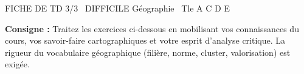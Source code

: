 \documentclass[11pt]{article}
\begin{document}
\begin{tcolorbox}[enhanced,colback=popink,colframe=popink,arc=10pt,boxrule=0pt,left=12pt,right=12pt,top=9pt,bottom=9pt]
{\color{white}\popxbold\small FICHE DE TD 3/3 \textbullet\ DIFFICILE \hfill Géographie \textbullet\ Tle A C D E\par}
\end{tcolorbox}
\vspace{4pt}
\noindent\textbf{Consigne :} Traitez les exercices ci-dessous en mobilisant vos connaissances du cours, vos savoir-faire cartographiques et votre esprit d'analyse critique. La rigueur du vocabulaire géographique (filière, norme, cluster, valorisation) est exigée.
\end{document}
